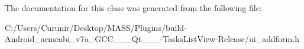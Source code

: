 The documentation for this class was generated from the following file\+:\begin{DoxyCompactItemize}
\item 
C\+:/\+Users/\+Curunir/\+Desktop/\+M\+A\+S\+S/\+Plugins/build-\/\+Android\+\_\+armeabi\+\_\+v7a\+\_\+\+G\+C\+C\+\_\+\_\+\_\+\+Qt\+\_\+\_\+\_-\/\+Tasks\+List\+View-\/\+Release/ui\+\_\+addform.\+h\end{DoxyCompactItemize}
